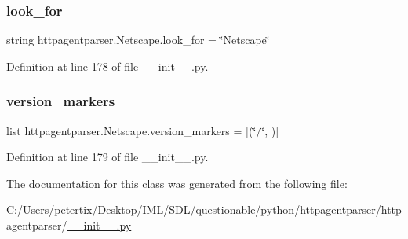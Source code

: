 \subsubsection{\texorpdfstring{look\+\_\+for}{look\_for}}
{\footnotesize\ttfamily string httpagentparser.\+Netscape.\+look\+\_\+for = \char`\"{}Netscape\char`\"{}\hspace{0.3cm}{\ttfamily [static]}}



Definition at line 178 of file \+\_\+\+\_\+init\+\_\+\+\_\+.\+py.

\hypertarget{classhttpagentparser_1_1_netscape_a238dc027567228bbfc3895a5f7b2d548}{}\label{classhttpagentparser_1_1_netscape_a238dc027567228bbfc3895a5f7b2d548} 
\subsubsection{\texorpdfstring{version\+\_\+markers}{version\_markers}}
{\footnotesize\ttfamily list httpagentparser.\+Netscape.\+version\+\_\+markers = \mbox{[}(\char`\"{}/\char`\"{}, \textquotesingle{}\textquotesingle{})\mbox{]}\hspace{0.3cm}{\ttfamily [static]}}



Definition at line 179 of file \+\_\+\+\_\+init\+\_\+\+\_\+.\+py.



The documentation for this class was generated from the following file\+:\begin{DoxyCompactItemize}
\item 
C\+:/\+Users/petertix/\+Desktop/\+I\+M\+L/\+S\+D\+L/questionable/python/httpagentparser/httpagentparser/\hyperlink{____init_____8py}{\+\_\+\+\_\+init\+\_\+\+\_\+.\+py}\end{DoxyCompactItemize}
